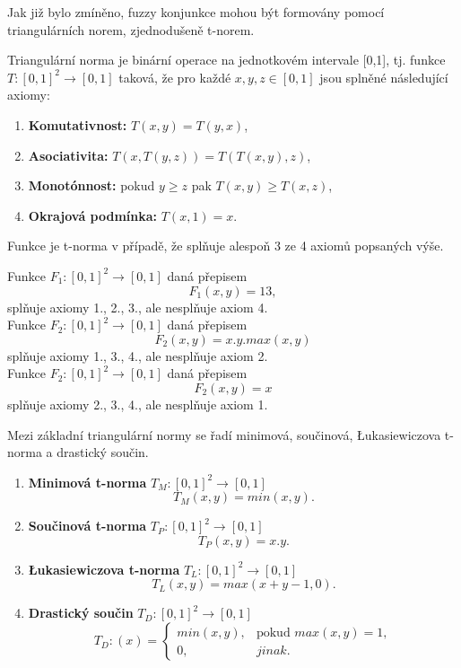 Jak již bylo zmíněno, fuzzy konjunkce mohou být formovány pomocí triangulárních norem, zjednodušeně t-norem. 
\begin{definition}
\cite{hlinena}
    Triangulární norma je binární operace na jednotkovém intervale [0,1], tj. funkce $T: [0,1]^2 \rightarrow [0,1]$ taková, že pro každé $x, y, z \in [0,1]$ jsou splněné následující axiomy:
    \begin{enumerate}
        \item \textbf{Komutativnost:} $T(x,y) = T(y,x)$,
        \item \textbf{Asociativita:} $T(x, T(y, z)) = T(T(x, y), z)$,
        \item \textbf{Monotónnost:} pokud $y \geq z$ pak $T(x, y) \geq T(x, z)$,
        \item \textbf{Okrajová podmínka:} $T(x, 1) = x$.
    \end{enumerate}
\end{definition}

\begin{remark}
    Funkce je t-norma v případě, že spl\v nuje alespo\v n 3 ze 4 axiom\r u popsaných výše.
\end{remark}

\begin{example}
    Funkce $F_1 : [0, 1]^2 \rightarrow [0, 1]$ daná přepisem\\
    $$F_1(x,y) = 13,$$
    spl\v nuje axiomy 1., 2., 3., ale nespl\v nuje axiom 4.\\

    Funkce $F_2 : [0, 1]^2 \rightarrow [0, 1]$ daná přepisem\\
    $$F_2(x,y) = x.y.max(x,y)$$
    spl\v nuje axiomy 1., 3., 4., ale nespl\v nuje axiom 2.\\

    Funkce $F_2 : [0, 1]^2 \rightarrow [0, 1]$ daná přepisem\\
    $$F_2(x,y) = x$$
    spl\v nuje axiomy 2., 3., 4., ale nespl\v nuje axiom 1.\\
    
\end{example}

Mezi základní triangulární normy se řadí minimová, součinová, Łukasiewiczova t-norma a drastický součin.
\begin{definition}
\cite{hlinena}
    \begin{enumerate}
    \item \textbf{Minimová t-norma} $T_M: [0,1]^2 \rightarrow [0,1]$
    $$T_M(x,y) = min(x,y).$$
    \item \textbf{Součinová t-norma} $T_P: [0,1]^2 \rightarrow [0,1]$
    $$T_P(x,y) = x.y.$$
    \item \textbf{Łukasiewiczova t-norma} $T_L: [0,1]^2 \rightarrow [0,1]$
    $$T_L(x,y) = max(x+y-1,0).$$
    \item \textbf{Drastický součin} $T_D: [0,1]^2 \rightarrow [0,1]$
    $$T_D:(x)=\begin{cases} min(x,y), & \mbox{pokud }  max(x,y) = 1,\\ 
    0, &  jinak.  \end{cases}$$
\end{enumerate}
\end{definition}

